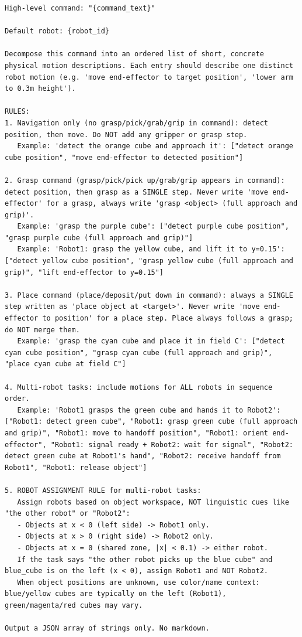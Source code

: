 \begin{lstlisting}[caption={Motion decomposition prompt (inspired by RT-H)}, extendedchars=true]
High-level command: "{command_text}"

Default robot: {robot_id}

Decompose this command into an ordered list of short, concrete physical motion descriptions. Each entry should describe one distinct robot motion (e.g. 'move end-effector to target position', 'lower arm to 0.3m height').

RULES:
1. Navigation only (no grasp/pick/grab/grip in command): detect position, then move. Do NOT add any gripper or grasp step.
   Example: 'detect the orange cube and approach it': ["detect orange cube position", "move end-effector to detected position"]

2. Grasp command (grasp/pick/pick up/grab/grip appears in command): detect position, then grasp as a SINGLE step. Never write 'move end-effector' for a grasp, always write 'grasp <object> (full approach and grip)'.
   Example: 'grasp the purple cube': ["detect purple cube position", "grasp purple cube (full approach and grip)"]
   Example: 'Robot1: grasp the yellow cube, and lift it to y=0.15': ["detect yellow cube position", "grasp yellow cube (full approach and grip)", "lift end-effector to y=0.15"]

3. Place command (place/deposit/put down in command): always a SINGLE step written as 'place object at <target>'. Never write 'move end-effector to position' for a place step. Place always follows a grasp; do NOT merge them.
   Example: 'grasp the cyan cube and place it in field C': ["detect cyan cube position", "grasp cyan cube (full approach and grip)", "place cyan cube at field C"]

4. Multi-robot tasks: include motions for ALL robots in sequence order.
   Example: 'Robot1 grasps the green cube and hands it to Robot2': ["Robot1: detect green cube", "Robot1: grasp green cube (full approach and grip)", "Robot1: move to handoff position", "Robot1: orient end-effector", "Robot1: signal ready + Robot2: wait for signal", "Robot2: detect green cube at Robot1's hand", "Robot2: receive handoff from Robot1", "Robot1: release object"]

5. ROBOT ASSIGNMENT RULE for multi-robot tasks:
   Assign robots based on object workspace, NOT linguistic cues like "the other robot" or "Robot2":
   - Objects at x < 0 (left side) -> Robot1 only.
   - Objects at x > 0 (right side) -> Robot2 only.
   - Objects at x = 0 (shared zone, |x| < 0.1) -> either robot.
   If the task says "the other robot picks up the blue cube" and blue_cube is on the left (x < 0), assign Robot1 and NOT Robot2.
   When object positions are unknown, use color/name context: blue/yellow cubes are typically on the left (Robot1), green/magenta/red cubes may vary.

Output a JSON array of strings only. No markdown.
\end{lstlisting}

